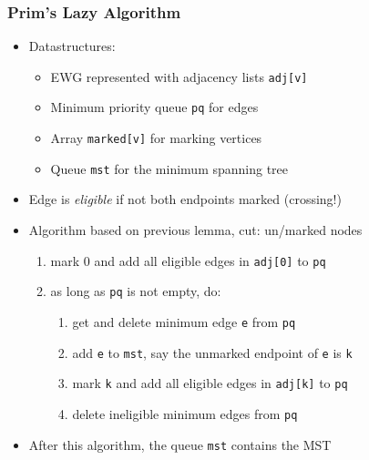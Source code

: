 \documentclass[handout]{beamer}
\begin{document}
\begin{frame}
    \frametitle{Prim's Lazy Algorithm}

\begin{itemize}[<+->]
\item Datastructures:
  \begin{itemize}
  \item EWG represented with adjacency lists {\tt adj[v]}
  \item Minimum priority queue {\tt pq} for edges
  \item Array {\tt marked[v]} for marking vertices
  \item Queue {\tt mst} for the minimum spanning tree
\end{itemize}
\item Edge is \emph{eligible} if not both endpoints marked (crossing!)
\item Algorithm based on previous lemma, cut: un/marked nodes

  \begin{enumerate}
  \item mark $0$ and add all eligible edges in {\tt adj[0]} to {\tt pq}
  \item as long as {\tt pq} is not empty, do:
\begin{enumerate}
  \item get and delete minimum edge {\tt e} from {\tt pq}
  \item add {\tt e} to {\tt mst}, say the unmarked endpoint of {\tt e} is {\tt k}
  \item mark {\tt k} and add all eligible edges in {\tt adj[k]} to {\tt pq}
  \item delete ineligible minimum edges from {\tt pq} 
\end{enumerate}
  \end{enumerate}
\item After this algorithm, the queue {\tt mst} contains the MST
\end{itemize} 
\end{frame}
\end{document}
